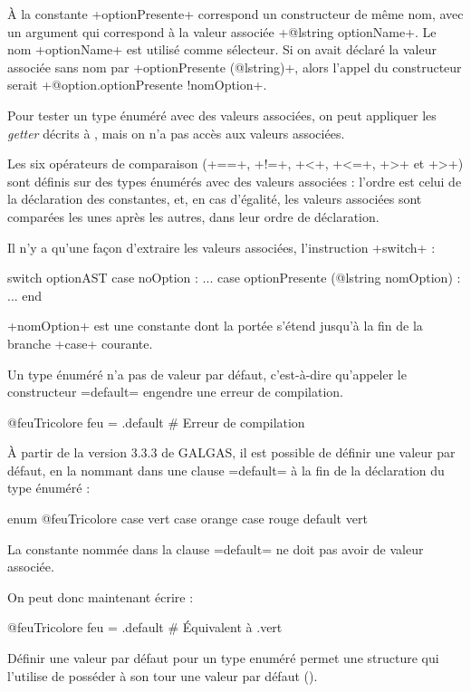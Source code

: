 À la constante \ggs+optionPresente+ correspond un constructeur de même nom, avec un argument qui correspond à la valeur associée \ggs+@lstring optionName+. Le nom \ggs+optionName+ est utilisé comme sélecteur. Si on avait déclaré la valeur associée sans nom par \ggs+optionPresente (@lstring)+, alors l'appel du constructeur serait \ggs+@option.optionPresente {!nomOption}+.

Pour tester un type énuméré avec des valeurs associées, on peut appliquer les \emph{getter} décrits à , mais on n'a pas accès aux valeurs associées.

Les six opérateurs de comparaison (\ggs+==+, \ggs+!=+, \ggs+<+, \ggs+<=+, \ggs+>+ et \ggs+>+) sont définis sur des types énumérés avec des valeurs associées : l'ordre est celui de la déclaration des constantes, et, en cas d'égalité, les valeurs associées sont comparées les unes après les autres, dans leur ordre de déclaration.

Il n'y a qu'une façon d'extraire les valeurs associées, l'instruction \ggs+switch+ :

\begin{galgas}
switch optionAST
case noOption : ...
case optionPresente (@lstring nomOption) : ...
end
\end{galgas}

\ggs+nomOption+ est une constante dont la portée s'étend jusqu'à la fin de la branche \ggs+case+ courante.













Un type énuméré n'a pas de valeur par défaut, c'est-à-dire qu'appeler le constructeur \ggs=default= engendre une erreur de compilation. 

\begin{galgas}
@feuTricolore feu = .default # Erreur de compilation
\end{galgas}

À partir de la version 3.3.3 de GALGAS, il est possible de définir une valeur par défaut, en la nommant dans une clause \ggs=default= à la fin de la déclaration du type énuméré :
\begin{galgas}
enum @feuTricolore {
  case vert
  case orange
  case rouge
  default vert
}
\end{galgas}

La constante nommée dans la clause \ggs=default= ne doit pas avoir de valeur associée.

On peut donc maintenant écrire :
\begin{galgas}
@feuTricolore feu = .default # Équivalent à .vert
\end{galgas}

Définir une valeur par défaut pour un type enuméré permet une structure qui l'utilise de posséder à son tour une valeur par défaut ().
